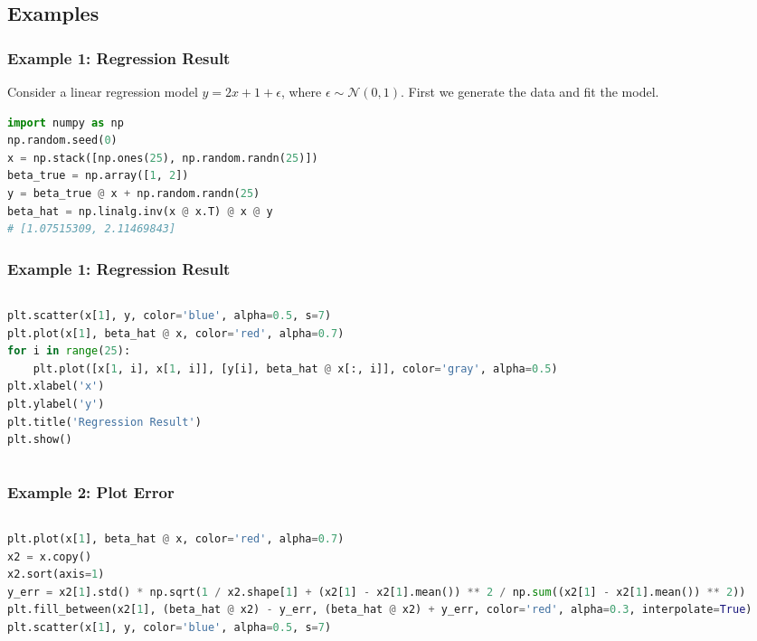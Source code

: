 \documentclass[beamer, en, version=2.0]{huangfusl-template}
\begin{document}
    \subsection{Examples}
    \begin{frame}[fragile]
        \frametitle{Example 1: Regression Result}

        Consider a linear regression model $y = 2x + 1 + \epsilon$, where $\epsilon \sim \mathcal{N}(0, 1)$. First we generate the data and fit the model.

\begin{lstlisting}[language=python]
import numpy as np
np.random.seed(0)
x = np.stack([np.ones(25), np.random.randn(25)])
beta_true = np.array([1, 2])
y = beta_true @ x + np.random.randn(25)
beta_hat = np.linalg.inv(x @ x.T) @ x @ y
# [1.07515309, 2.11469843]
\end{lstlisting}

    \end{frame}
    \begin{frame}[fragile]
        \frametitle{Example 1: Regression Result}

        \begin{columns}
        \begin{column}{0.5\textwidth}
\begin{lstlisting}[language=python, breaklines]
plt.scatter(x[1], y, color='blue', alpha=0.5, s=7)
plt.plot(x[1], beta_hat @ x, color='red', alpha=0.7)
for i in range(25):
    plt.plot([x[1, i], x[1, i]], [y[i], beta_hat @ x[:, i]], color='gray', alpha=0.5)
plt.xlabel('x')
plt.ylabel('y')
plt.title('Regression Result')
plt.show()
\end{lstlisting}
        \end{column}
        \begin{column}{0.5\textwidth}
            
        \end{column}
        \end{columns}
    \end{frame}
    \begin{frame}[fragile]
        \frametitle{Example 2: Plot Error}

        \begin{columns}
        \begin{column}{0.5\textwidth}
\begin{lstlisting}[language=python, breaklines]
plt.plot(x[1], beta_hat @ x, color='red', alpha=0.7)
x2 = x.copy()
x2.sort(axis=1)
y_err = x2[1].std() * np.sqrt(1 / x2.shape[1] + (x2[1] - x2[1].mean()) ** 2 / np.sum((x2[1] - x2[1].mean()) ** 2))
plt.fill_between(x2[1], (beta_hat @ x2) - y_err, (beta_hat @ x2) + y_err, color='red', alpha=0.3, interpolate=True)
plt.scatter(x[1], y, color='blue', alpha=0.5, s=7)
\end{lstlisting}
        \end{column}
        \begin{column}{0.5\textwidth}
            
        \end{column}
        \end{columns}
    \end{frame}
\end{document}

